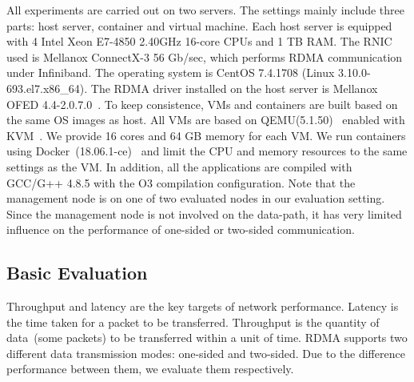 All experiments are carried out on two servers. The settings mainly include three parts: host server, container and virtual machine. 
Each host server is equipped with 4 Intel Xeon E7-4850 2.40GHz 16-core CPUs and 1 TB RAM. The RNIC used is Mellanox ConnectX-3 56 Gb/sec, which performs RDMA communication under Infiniband.  The operating system is CentOS 7.4.1708 (Linux 3.10.0-693.el7.x86\_64). The RDMA driver installed on the host server is Mellanox OFED 4.4-2.0.7.0~\cite{mlnx-ofed}. To keep consistence, VMs and containers are built based on the same OS images as host. All VMs are based on QEMU(5.1.50)~\cite{qemu} enabled with KVM~\cite{kvm}. We provide 16 cores and 64 GB memory for each VM. We run containers using Docker~(18.06.1-ce)~\cite{docker} and limit the CPU and memory resources to the same settings as the VM. In addition, all the applications are compiled with GCC/G++ 4.8.5 with the O3 compilation configuration. Note that the management node is on one of two evaluated nodes in our evaluation setting. Since the management node is not involved on the data-path, it has very limited influence on the performance of one-sided or two-sided communication.


\subsection{Basic Evaluation}

Throughput and latency are the key targets of network performance. Latency is the time taken for a packet to be transferred. Throughput is the quantity of data~(some packets) to be transferred within a unit of time. RDMA supports two different data transmission modes: one-sided and two-sided. Due to the difference performance between them, we evaluate them respectively.


